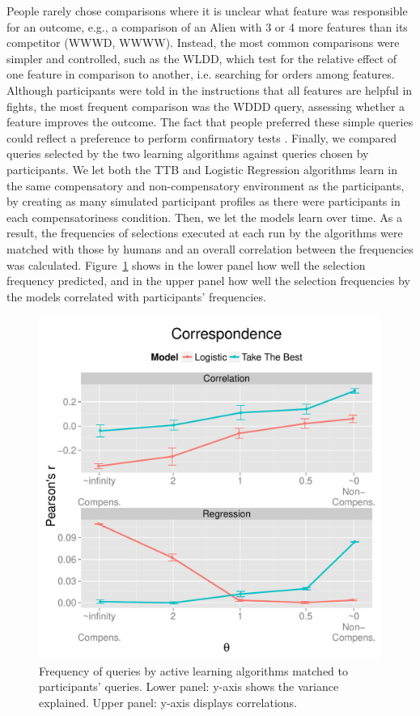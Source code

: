 \documentclass[10pt,letterpaper]{article}
\begin{document}
People rarely chose comparisons where it is unclear what feature was responsible for an outcome, e.g., a  comparison of an Alien with 3 or 4 more features than its competitor (WWWD, WWWW). Instead, the most common comparisons were simpler and controlled, such as the WLDD, which test for the relative effect of one feature in comparison to another, i.e. searching for orders among features. Although participants were told in the instructions that all features are helpful in fights, the most frequent comparison was the WDDD query, assessing whether a feature improves the outcome. The fact that people preferred these simple queries could reflect a preference to perform confirmatory tests \citep{markant2012one}. Finally, we compared queries selected by the two learning algorithms against queries chosen by participants. We let both the TTB and Logistic Regression algorithms learn in the same compensatory and non-compensatory environment as the participants, by creating as many simulated participant profiles as there were participants in each compensatoriness condition. Then, we let the models learn over time. As a result, the frequencies of selections executed at each run by the algorithms were matched with those by humans and an overall correlation between the frequencies was calculated. Figure~\ref{result} shows in the lower panel how well the selection frequency predicted, and in the upper panel how well the selection frequencies by the models correlated with participants' frequencies.
\begin{figure}[htb!]
\centering
\includegraphics[scale=0.5]{results.pdf}
\caption{Frequency of queries by active learning algorithms matched to participants' queries. Lower panel:  y-axis shows the variance explained. Upper panel: y-axis displays correlations.}
\label{result}
\end{figure}
\end{document}
